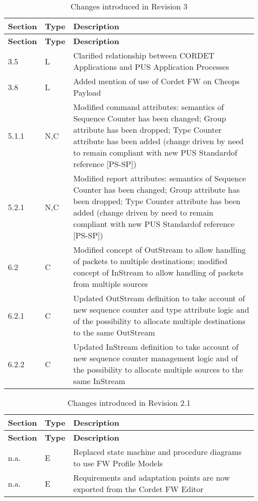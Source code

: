 \documentclass{pnp_article}
\begin{document}
\begin{longtable}{|p{1.5cm}|p{1cm}|p{8cm}|}
\caption{Changes introduced in Revision 3}  \\
\hline
\rowcolor{light-gray}
\textbf{Section} & \textbf{Type} & \textbf{Description} \\
\hline\hline
\endfirsthead
\rowcolor{light-gray}
\textbf{Section} & \textbf{Type} & \textbf{Description} \\
\hline\hline
\endhead
3.5 & L & Clarified relationship between CORDET Applications and PUS Application Processes \\
\hline
3.8 & L & Added mention of use of Cordet FW on Cheops Payload \\
\hline
5.1.1 & N,C & Modified command attributes: semantics of Sequence Counter has been changed; Group attribute has been dropped; Type Counter attribute has been added (change driven by need to remain compliant with new PUS Standardof reference [PS-SP]) \\
\hline
5.2.1 & N,C & Modified report attributes: semantics of Sequence Counter has been changed; Group attribute has been dropped; Type Counter attribute has been added (change driven by need to remain compliant with new PUS Standardof reference [PS-SP]) \\
\hline
6.2 & C & Modified concept of OutStream to allow handling of packets to multiple destinations; modified concept of InStream to allow handling of packets from multiple sources \\
\hline
6.2.1 & C & Updated OutStream definition to take account of new sequence counter and type attribute logic and of the possibility to allocate multiple destinations to the same OutStream \\
\hline
6.2.2 & C & Updated InStream definition to take account of new sequence counter management logic and of the possibility to allocate multiple sources to the same InStream \\
\hline
\end{longtable}

\begin{longtable}{|p{1.5cm}|p{1cm}|p{8cm}|}
\caption{Changes introduced in Revision 2.1}  \\
\hline
\rowcolor{light-gray}
\textbf{Section} & \textbf{Type} & \textbf{Description} \\
\hline\hline
\endfirsthead
\rowcolor{light-gray}
\textbf{Section} & \textbf{Type} & \textbf{Description} \\
\hline\hline
\endhead
n.a. & E & Replaced state machine and procedure diagrams to use FW Profile Models \\
\hline
n.a. & E & Requirements and adaptation points are now exported from the Cordet FW Editor \\
\hline
\end{longtable}
\end{document}
